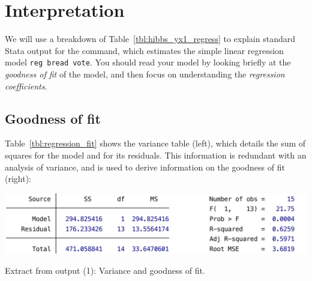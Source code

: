 %
%
%
\section{Interpretation}

We will use a breakdown of Table~\ref{tbl:hibbs_yx1_regress} to explain standard Stata output for the  command, which estimates the simple linear regression model \texttt{reg bread vote}. You should read your model by looking briefly at the \emph{goodness of fit} of the model, and then focus on understanding the \emph{regression coefficients}.

% 	
% 

	\subsection{Goodness of fit}

	\label{sec:goodness}%
	Table~\ref{tbl:regression_fit} shows the variance table (left), which details the sum of squares for the model and for its residuals. This information is redundant with an analysis of variance, and is used to derive information on the goodness of fit (right):

	\begin{table}[htp]
		\includegraphics[scale=.5]{images/hibbs_yx1_regress_top.pdf}

	  	\caption[Extract from  output (1): Variance and goodness of fit]{\label{tbl:regression_fit}
		Extract from  output (1): Variance and goodness of fit.\\
		\hibbs}
	\end{table}%

